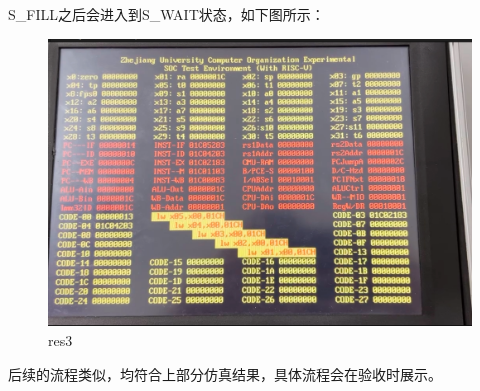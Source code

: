 S\_FILL之后会进入到S\_WAIT状态，如下图所示：
\begin{figure}[H]
    \centering
    \includegraphics[width=1.0\textwidth]{figs/res3.png}
    \caption{res3}
    \label{Fig.16}
\end{figure}


后续的流程类似，均符合上部分仿真结果，具体流程会在验收时展示。